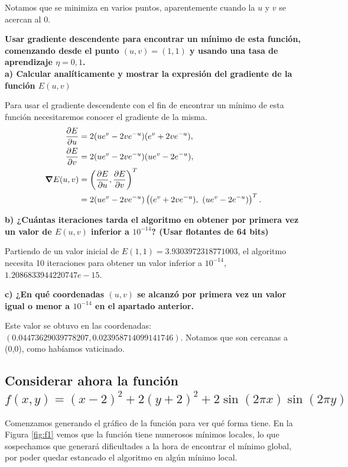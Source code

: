 \documentclass[a4paper, 20pt]{article}
\begin{document}
Notamos que se minimiza en varios puntos, aparentemente cuando la $u$ y $v$ se acercan al 0.

\textbf{Usar gradiente descendente para encontrar un mínimo de esta función, comenzando desde el punto $(u, v) = (1, 1)$ y usando una tasa de aprendizaje $\eta = 0,1$.\\
a) Calcular analíticamente y mostrar la expresión del gradiente de la función $E(u, v)$}

Para usar el gradiente descendente con el fin de encontrar un mínimo de esta función necesitaremos conocer el gradiente de  la misma.
\begin{align*}
\pdv{E}{u}(u,v) &= 2(ue^v - 2ve^{-u})(e^v+2ve^{-u}),\\
\pdv{E}{v}(u,v) &= 2(ue^v - 2ve^{-u})(ue^v-2e^{-u}),\\
\grad{E}(u,v) &= \left(\pdv{E}{u}(u,v), \pdv{E}{v}(u,v)\right)^T\\
	      &= 2(ue^v - 2ve^{-u})\left((e^v+2ve^{-u}),\ (ue^v-2e^{-u})\right)^T.
\end{align*}

\textbf{b) ¿Cuántas iteraciones tarda el algoritmo en obtener por primera vez un valor de $E(u, v)$ inferior a $10^{-14}$? (Usar flotantes de 64 bits)}

Partiendo de un valor inicial de $E(1,1) =  3.9303972318771003$, el algoritmo necesita 10 iteraciones para obtener un valor inferior a $10^{-14}$, $1.2086833944220747e-15$.

\textbf{c) ¿En qué coordenadas $(u, v)$ se alcanzó por primera vez un valor igual o menor a $10^{-14}$ en el apartado anterior.}

Este valor se obtuvo en las coordenadas: $(0.04473629039778207,  0.023958714099141746)$. Notamos que son cercanas a (0,0), como habíamos vaticinado.

\subsection{Considerar ahora la función $f(x, y) = (x - 2)^2 + 2(y + 2)^2 + 2 \sin{(2 \pi x)} \sin(2\pi y)$}

Comenzamos generando el gráfico de la función para ver qué forma tiene. En la Figura \ref{fig:f1} vemos que la función tiene numerosos mínimos locales, lo que sospechamos que generará dificultades a la hora de encontrar el mínimo global, por poder quedar estancado el algoritmo en algún mínimo local.
\end{document}
